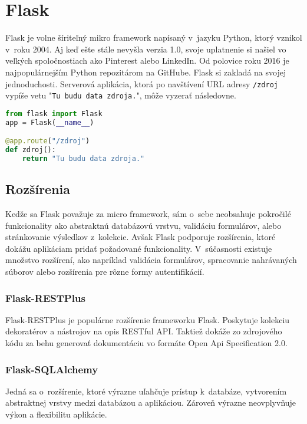\documentclass[../projekt.tex]{subfiles}
\begin{document}
\section{Flask}\label{flask}
Flask je volne šíriteľný mikro framework napísaný v~jazyku Python, ktorý vznikol v~roku 2004. Aj keď ešte stále nevyšla verzia 1.0, svoje uplatnenie si našiel vo veľkých spoločnostiach ako Pinterest alebo LinkedIn. Od polovice roku 2016 je najpopulárnejším Python repozitárom na GitHube.
\newline
\newline
Flask si zakladá na svojej jednoduchosti. Serverová aplikácia, ktorá po navštívení URL adresy \texttt{/zdroj} vypíše vetu "\texttt{Tu budu data zdroja.}", môže vyzerať následovne.
\begin{lstlisting}[language=Python, caption=Jednoduchá aplikácia,frame=tlrb]
from flask import Flask
app = Flask(__name__)

@app.route("/zdroj")
def zdroj():
    return "Tu budu data zdroja."
\end{lstlisting}


\subsection{Rozšírenia}
Kedže sa Flask považuje za micro framework, sám o~sebe neobsahuje pokročilé funkcionality ako abstraktnú databázovú vrstvu, validáciu formulárov, alebo stránkovanie výsledkov z~kolekcie. Avšak Flask podporuje rozšírenia, ktoré dokážu aplikáciam pridať požadované funkcionality. V~súčasnosti existuje množstvo rozšírení, ako napríklad validácia formulárov, spracovanie nahrávaných súborov alebo rozšírenia pre rôzne formy autentifikácií.


\subsubsection{Flask-RESTPlus}
Flask-RESTPlus je populárne rozšírenie frameworku Flask. Poskytuje kolekciu dekoratérov a nástrojov na opis RESTful API. Taktiež dokáže zo zdrojového kódu za behu generovať dokumentáciu vo formáte Open Api Specification 2.0.




\subsubsection{Flask-SQLAlchemy}
Jedná sa o~rozšírenie, ktoré výrazne uľahčuje prístup k~databáze, vytvorením abstraktnej vrstvy medzi databázou a aplikáciou. Zároveň výrazne neovplyvňuje výkon a flexibilitu aplikácie.
\end{document}
